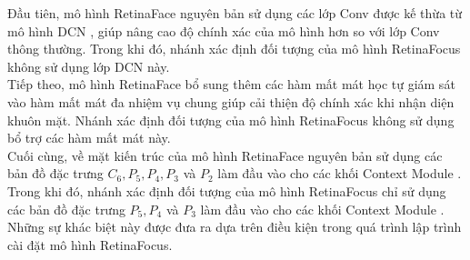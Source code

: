 {    \noindent
    Đầu tiên, mô hình RetinaFace nguyên bản sử dụng các lớp Conv được kế thừa từ mô hình DCN \cite{dai2017deformable}, giúp nâng cao độ chính xác của mô hình hơn so với lớp Conv thông thường.
    Trong khi đó, nhánh xác định đối tượng của mô hình RetinaFocus không sử dụng lớp DCN này. \\
    Tiếp theo, mô hình RetinaFace bổ sung thêm các hàm mất mát học tự giám sát \cite{zhou2019dense, genova2018unsupervised} vào hàm mất mát đa nhiệm vụ chung giúp cải thiện độ chính xác khi nhận diện khuôn mặt.
    Nhánh xác định đối tượng của mô hình RetinaFocus không sử dụng bổ trợ các hàm mất mát này. \\
    Cuối cùng, về mặt kiến trúc của mô hình RetinaFace nguyên bản sử dụng các bản đồ đặc trưng $C_6, P_5, P_4, P_3$ và $P_2$ làm đầu vào cho các khối Context Module \cite{najibi2017ssh}.
    Trong khi đó, nhánh xác định đối tượng của mô hình RetinaFocus chỉ sử dụng các bản đồ đặc trưng $P_5, P_4$ và $P_3$ làm đầu vào cho các khối Context Module \cite{najibi2017ssh}. \\
    Những sự khác biệt này được đưa ra dựa trên điều kiện trong quá trình lập trình cài đặt mô hình RetinaFocus.
}